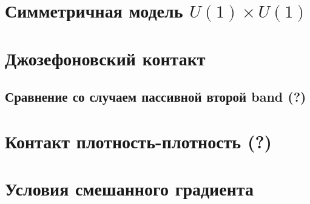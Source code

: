 \section{Симметричная модель \texorpdfstring{$ U(1) \times U(1) $}
  {U(1) x U(1)}}
\label{sec:3-1}

\section{Джозефоновский контакт}
\label{sec:3-2}

\subsection{Сравнение со случаем пассивной второй band (?)}
\label{subsec:3-2-1}

\section{Контакт плотность-плотность (?)}
\label{sec:3-3}

\section{Условия смешанного градиента}
\label{sec:3-4}
